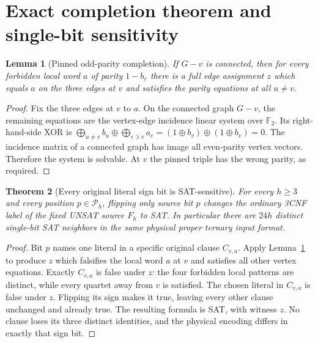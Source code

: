 \documentclass[11pt]{article}
\newtheorem{theorem}{Theorem}
\newtheorem{lemma}[theorem]{Lemma}
\begin{document}
\section{Exact completion theorem and single-bit sensitivity}
\begin{lemma}[Pinned odd-parity completion]\label{lem:pinned}
If $G-v$ is connected, then for every forbidden local word $a$ of parity $1-b_v$ there is a full edge assignment $z$ which equals $a$ on the three edges at $v$ and satisfies the parity equations at \emph{all} $u\ne v$.
\end{lemma}
\begin{proof}
Fix the three edges at $v$ to $a$. On the connected graph $G-v$, the remaining equations are the vertex-edge incidence linear system over $\mathbb F_2$. Its right-hand-side XOR is $\bigoplus_{u\ne v}b_u\oplus\bigoplus_{e\ni v}a_e=(1\oplus b_v)\oplus(1\oplus b_v)=0$. The incidence matrix of a connected graph has image all even-parity vertex vectors. Therefore the system is solvable. At $v$ the pinned triple has the wrong parity, as required.\end{proof}

\begin{theorem}[Every original literal sign bit is SAT-sensitive]\label{th:single}
For every $h\ge3$ and every position $p\in\mathcal P_h$, flipping \emph{only} source bit $p$ changes the \emph{ordinary} 3CNF label of the fixed UNSAT source $F_h$ to SAT. In particular there are $24h$ distinct single-bit SAT neighbors in the same physical proper ternary input format.
\end{theorem}
\begin{proof}
Bit $p$ names one literal in a specific original clause $C_{v,a}$. Apply Lemma~\ref{lem:pinned} to produce $z$ which falsifies the local word $a$ at $v$ and satisfies all other vertex equations. Exactly $C_{v,a}$ is false under $z$: the four forbidden local patterns are distinct, while every quartet away from $v$ is satisfied. The chosen literal in $C_{v,a}$ is false under $z$. Flipping its sign makes it true, leaving every other clause unchanged and already true. The resulting formula is SAT, with witness $z$. No clause loses its three distinct identities, and the physical encoding differs in exactly that sign bit.\end{proof}
\end{document}
